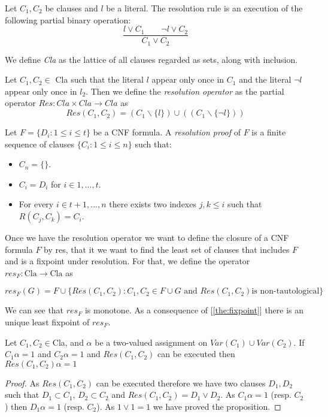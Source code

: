 \begin{definition}
  Let $C_1,C_2$ be clauses and $l$ be a literal. The resolution rule is an execution of the following partial binary operation:
  $$\frac{l \lor C_1 \qquad \neg l \lor C_2}{ C_1 \lor C_2}$$
\end{definition}

\begin{definition}
  
We define \emph{Cla} as the lattice of all clauses regarded as sets, along with inclusion. 
\end{definition}

\begin{definition}
 Let $C_1,C_2\in$ Cla  such that the literal $l$ appear only once in $C_1$ and the literal $\neg l$ appear only once in $l_2$. Then we define the \emph{resolution operator} as the partial operator $Res: Cla \times Cla \to Cla$ as
  $$Res(C_1,C_2) = (C_1 \backslash \{l\}) \cup ((C_1 \backslash \{\neg l\}))$$
\end{definition}

\begin{definition}
  Let $F = \{D_i : 1 \le i \le t\}$ be a CNF formula. A \emph{resolution proof} of $F$ is a finite sequence of clauses $\{C_i : 1\le i \le n\}$ such that:
  \begin{itemize}
  \item $C_n = \{\}$.
  \item $C_i  = D_i $ for $i\in 1,...,t$.
  \item For every $i\in t+1,...,n$ there exists two indexes $j,k\le i$ such that $R(C_j,C_k)  = C_i$.
  \end{itemize}
\end{definition}

Once we have  the resolution operator we want to define the closure of a CNF formula $F$ by res, that it we want to find the least set of clauses that includes $F$ and is a fixpoint under resolution. For that, we define the operator $res_F:\text{Cla}\to\text{Cla}$ as

$$res_F(G) = F \cup \{Res(C_1,C_2) : C_1,C_2 \in F \cup G \text{ and } Res(C_1,C_2) \text{is non-tautological}\}$$


We can see that $res_F$ is monotone. As a consequence of [\ref{the:fixpoint}] there is an unique least fixpoint of $res_F$.

\begin{proposition} \label{pro:sound}
  Let $C_1, C_2 \in $Cla, and $\alpha$ be a two-valued assignment on $Var(C_1)\cup Var(C_2)$. If $C_1 \alpha = 1$ and $C_2 \alpha = 1$ and $Res(C_1,C_2)$ can be executed then $Res(C_1,C_2) \alpha = 1$
\end{proposition}
\begin{proof}
As $Res(C_1,C_2)$ can be executed therefore we have two clauses $D_1,D_2$ such that $D_1 \subset C_1$, $D_2 \subset C_2$ and $Res(C_1,C_2) = D_1\vee D_2$. As $C_1\alpha = 1$ (resp. $C_2$) then $D_1\alpha = 1$ (resp. $C_2$). As $1 \vee 1=1$ we have proved the proposition.
\end{proof}

